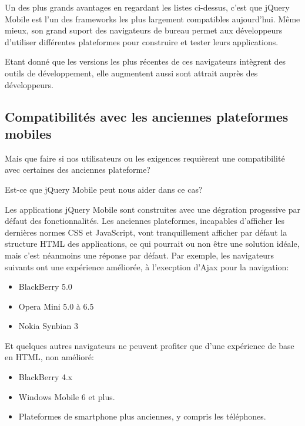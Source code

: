 Un des plus grands avantages en regardant les listes ci-dessus, c’est que jQuery Mobile est l’un des frameworks les plus largement compatibles aujourd’hui. Même mieux, son grand suport des navigateurs de bureau permet aux développeurs d’utiliser différentes plateformes pour construire et tester leurs applications.

Etant donné que les versions les plus récentes de ces navigateurs intègrent des outils de développement, elle augmentent aussi sont attrait auprès des développeurs.

\subsection{Compatibilités avec les anciennes plateformes mobiles}

Mais que faire si nos utilisateurs ou les exigences requièrent une compatibilité avec certaines des anciennes plateforme?

Est-ce que jQuery Mobile peut nous aider dans ce cas?

Les applications jQuery Mobile sont construites avec une dégration  progessive par défaut des fonctionnalités. Les anciennes plateformes, incapables d’afficher les dernières normes CSS et JavaScript, vont tranquillement afficher par défaut la structure HTML des applications, ce qui pourrait ou non être une solution idéale, mais c'est néanmoins une réponse par défaut.
Par exemple, les navigateurs suivants ont une expérience améliorée, à l’execption d’Ajax pour la navigation:

\begin{itemize}
  \item[\textbullet]
  BlackBerry 5.0
  
  \item[\textbullet]
  Opera Mini 5.0 à 6.5
  
  \item[\textbullet]
  Nokia Synbian 3
\end{itemize}

Et quelques autres navigateurs ne peuvent profiter que d’une expérience de base en HTML, non amélioré:

\begin{itemize}
  \item[\textbullet]
  BlackBerry 4.x
  
  \item[\textbullet]
  Windows Mobile 6 et plus.
  
  \item[\textbullet]
  Plateformes de smartphone plus anciennes, y compris les téléphones.
  
\end{itemize}

